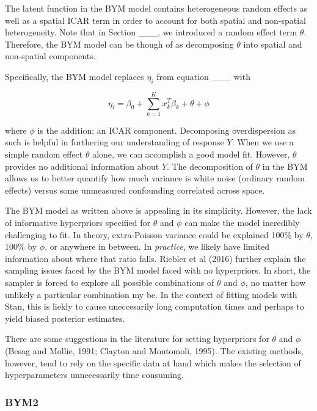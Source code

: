 \documentclass[
]{article}
\begin{document}
The latent function in the BYM model contains heterogeneous random
effects as well as a spatial ICAR term in order to account for both
spatial and non-spatial heterogeneity. Note that in Section \_\_\_, we
introduced a random effect term \(\theta\). Therefore, the BYM model can
be though of as decomposing \(\theta\) into spatial and non-spatial
components.

Specifically, the BYM model replaces \(\eta_i\) from equation \_\_\_
with

\[
\eta_i = \beta_0 + \sum_{k=1}^{K}x_k^T\beta_k + \theta + \phi
\]

where \(\phi\) is the addition: an ICAR component. Decomposing
overdispersion as such is helpful in furthering our understanding of
response \(Y\). When we use a simple random effect \(\theta\) alone, we
can accomplish a good model fit. However, \(\theta\) provides no
additional information about \(Y\). The decomposition of \(\theta\) in
the BYM allows us to better quantify how much variance is white noise
(ordinary random effects) versus some unmeasured confounding correlated
across space.

The BYM model as written above is appealing in its simplicity. However,
the lack of informative hyperpriors specified for \(\theta\) and
\(\phi\) can make the model incredibly challenging to fit. In theory,
extra-Poisson variance could be explained 100\% by \(\theta\), 100\% by
\(\phi\), or anywhere in between. In \emph{practice}, we likely have
limited information about where that ratio falls. Riebler et al (2016)
further explain the sampling issues faced by the BYM model faced with no
hyperpriors. In short, the sampler is forced to explore all possible
combinations of \(\theta\) and \(\phi\), no matter how unlikely a
particular combination my be. In the context of fitting models with
Stan, this is liekly to cause uneccesarily long computation times and
perhaps to yield biased posterior estimates.

There are some suggestions in the literature for setting hyperpriors for
\(\theta\) and \(\phi\) (Besag and Mollie, 1991; Clayton and Montomoli,
1995). The existing methods, however, tend to rely on the specific data
at hand which makes the selection of hyperparameters unnecessarily time
consuming.

\hypertarget{bym2}{%
\subsubsection{BYM2}\label{bym2}}
\end{document}

